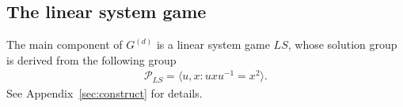 \documentclass[11pt,letterpaper]{article}
\newcommand{\ketbra}[2]{|#1\rangle\langle#2|}
\newcommand{\1}{\mathbb{1}}
\newcommand{\Pg}{\mathcal{P}}
\newcommand{\J}{\mathcal{J}}
\newcommand{\paulix}[1]{\sigma_x^{(#1)}}
\newcommand{\pauliz}[1]{\sigma_z^{(#1)}}
\newcommand{\G}[1]{G^{(#1)}}
\newcommand{\LS}{LS}
\theoremstyle{definition}
\begin{document}
\subsection{The linear system game}
The main component of $\G{d}$ is a linear system game $\LS$, whose solution group is derived from the 
following group
\begin{align}
	\Pg_{\LS} = \langle u, x : uxu^{-1} = x^2 \rangle.
\end{align}
%
See Appendix~\ref{sec:construct} for details.
\end{document}
